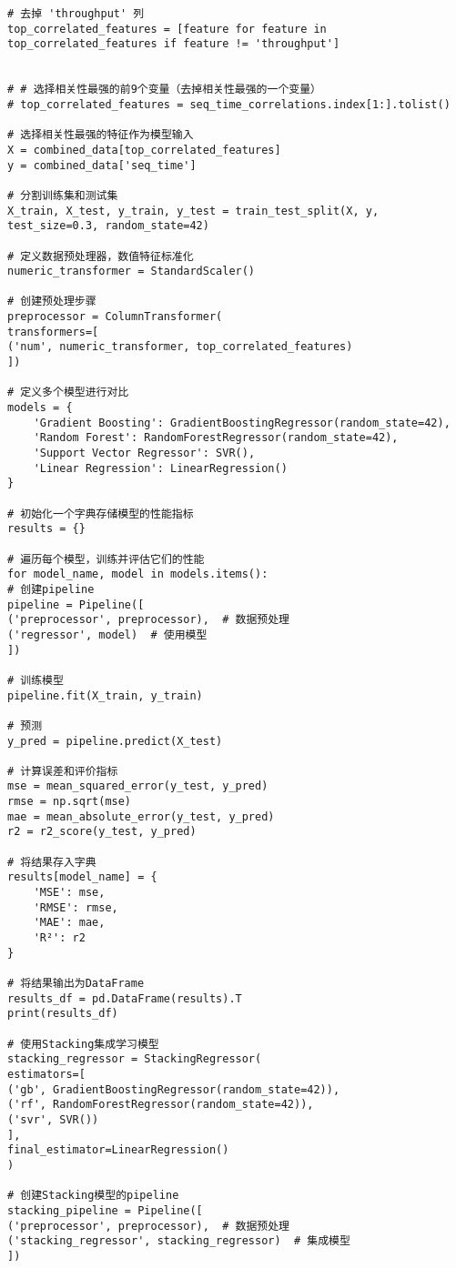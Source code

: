 \documentclass[bwprint,fontset=windows]{gmcmthesis}
\begin{document}
\begin{lstlisting}
# 去掉 'throughput' 列
top_correlated_features = [feature for feature in top_correlated_features if feature != 'throughput']


# # 选择相关性最强的前9个变量（去掉相关性最强的一个变量）
# top_correlated_features = seq_time_correlations.index[1:].tolist()

# 选择相关性最强的特征作为模型输入
X = combined_data[top_correlated_features]
y = combined_data['seq_time']

# 分割训练集和测试集
X_train, X_test, y_train, y_test = train_test_split(X, y, test_size=0.3, random_state=42)

# 定义数据预处理器，数值特征标准化
numeric_transformer = StandardScaler()

# 创建预处理步骤
preprocessor = ColumnTransformer(
transformers=[
('num', numeric_transformer, top_correlated_features)
])

# 定义多个模型进行对比
models = {
	'Gradient Boosting': GradientBoostingRegressor(random_state=42),
	'Random Forest': RandomForestRegressor(random_state=42),
	'Support Vector Regressor': SVR(),
	'Linear Regression': LinearRegression()
}

# 初始化一个字典存储模型的性能指标
results = {}

# 遍历每个模型，训练并评估它们的性能
for model_name, model in models.items():
# 创建pipeline
pipeline = Pipeline([
('preprocessor', preprocessor),  # 数据预处理
('regressor', model)  # 使用模型
])

# 训练模型
pipeline.fit(X_train, y_train)

# 预测
y_pred = pipeline.predict(X_test)

# 计算误差和评价指标
mse = mean_squared_error(y_test, y_pred)
rmse = np.sqrt(mse)
mae = mean_absolute_error(y_test, y_pred)
r2 = r2_score(y_test, y_pred)

# 将结果存入字典
results[model_name] = {
	'MSE': mse,
	'RMSE': rmse,
	'MAE': mae,
	'R²': r2
}

# 将结果输出为DataFrame
results_df = pd.DataFrame(results).T
print(results_df)

# 使用Stacking集成学习模型
stacking_regressor = StackingRegressor(
estimators=[
('gb', GradientBoostingRegressor(random_state=42)),
('rf', RandomForestRegressor(random_state=42)),
('svr', SVR())
],
final_estimator=LinearRegression()
)

# 创建Stacking模型的pipeline
stacking_pipeline = Pipeline([
('preprocessor', preprocessor),  # 数据预处理
('stacking_regressor', stacking_regressor)  # 集成模型
])


\end{lstlisting}
\end{document}
